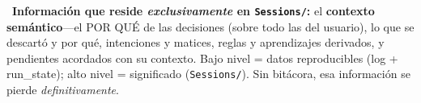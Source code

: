 \documentclass[11pt,a4paper]{article}
\begin{document}
\begin{cajaConcepto}
~\textbf{Información que reside \emph{exclusivamente} en \texttt{Sessions/}:}
el \textbf{contexto semántico}---el POR QUÉ de las decisiones (sobre todo las del usuario),
lo que se descartó y por qué, intenciones y matices, reglas y aprendizajes derivados, y
pendientes acordados con su contexto. Bajo nivel = datos reproducibles (log + run\_state);
alto nivel = significado (\texttt{Sessions/}). Sin bitácora, esa información se pierde
\emph{definitivamente}.
\end{cajaConcepto}
\end{document}
